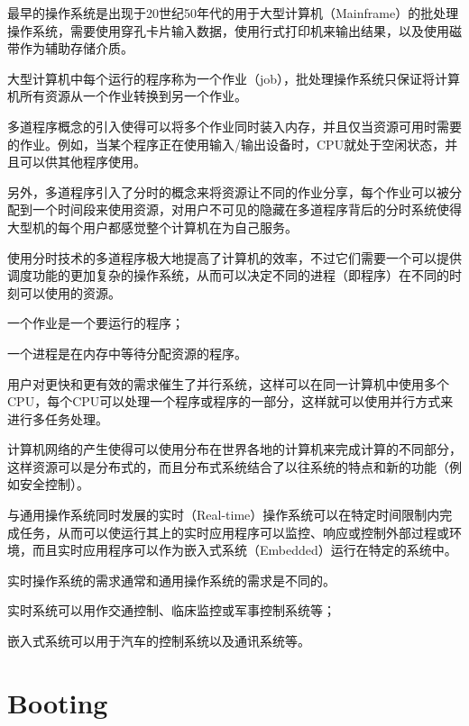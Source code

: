 最早的操作系统是出现于20世纪50年代的用于大型计算机（Mainframe）的批处理操作系统，需要使用穿孔卡片输入数据，使用行式打印机来输出结果，以及使用磁带作为辅助存储介质。

大型计算机中每个运行的程序称为一个作业（job），批处理操作系统只保证将计算机所有资源从一个作业转换到另一个作业。

多道程序概念的引入使得可以将多个作业同时装入内存，并且仅当资源可用时需要的作业。例如，当某个程序正在使用输入/输出设备时，CPU就处于空闲状态，并且可以供其他程序使用。

另外，多道程序引入了分时的概念来将资源让不同的作业分享，每个作业可以被分配到一个时间段来使用资源，对用户不可见的隐藏在多道程序背后的分时系统使得大型机的每个用户都感觉整个计算机在为自己服务。


使用分时技术的多道程序极大地提高了计算机的效率，不过它们需要一个可以提供调度功能的更加复杂的操作系统，从而可以决定不同的进程（即程序）在不同的时刻可以使用的资源。

\begin{compactitem}
\item 一个作业是一个要运行的程序；
\item 一个进程是在内存中等待分配资源的程序。
\end{compactitem}

用户对更快和更有效的需求催生了并行系统，这样可以在同一计算机中使用多个CPU，每个CPU可以处理一个程序或程序的一部分，这样就可以使用并行方式来进行多任务处理。

计算机网络的产生使得可以使用分布在世界各地的计算机来完成计算的不同部分，这样资源可以是分布式的，而且分布式系统结合了以往系统的特点和新的功能（例如安全控制）。

与通用操作系统同时发展的实时（Real-time）操作系统可以在特定时间限制内完成任务，从而可以使运行其上的实时应用程序可以监控、响应或控制外部过程或环境，而且实时应用程序可以作为嵌入式系统（Embedded）运行在特定的系统中。

实时操作系统的需求通常和通用操作系统的需求是不同的。

\begin{compactitem}
\item 实时系统可以用作交通控制、临床监控或军事控制系统等；
\item 嵌入式系统可以用于汽车的控制系统以及通讯系统等。
\end{compactitem}

\section{Booting}


